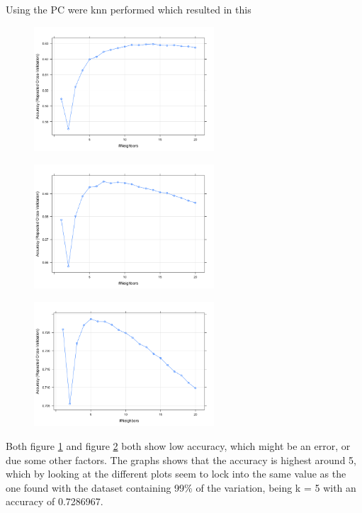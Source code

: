 Using the PC were knn performed which resulted in this

\begin{figure}[H]
\centering
\includegraphics[width = 0.6\textwidth]{graphics/kNN_plot_80.png}
\label{fig:knnFit_80}
\caption{}
\end{figure}


\begin{figure}[H]
\centering
\includegraphics[width = 0.6\textwidth]{graphics/kNN_plot_90.png}
\label{fig:knnFit_90}
\caption{}
\end{figure}


\begin{figure}[H]
\centering
\includegraphics[width = 0.6\textwidth]{graphics/kNN_plot_99.png}
\label{fig:knnFit_99}
\caption{}
\end{figure}

Both figure \ref{fig:knnFit_80} and figure \ref{fig:knnFit_90} both show low accuracy, which might be an error, or due some other factors.  The graphs shows that the accuracy is highest around 5, which by looking at the different plots seem to lock into the same value as the one found with the dataset containing 99\% of the variation, being k = 5 with an accuracy of 0.7286967.  

